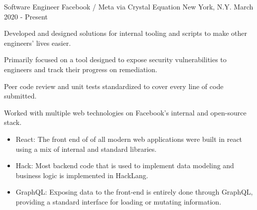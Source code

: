 

\begin{cventries}

  \cventry
    {Software Engineer} %
    {Facebook / Meta via Crystal Equation} %
    {New York, N.Y.} %
    {March 2020 - Present} %
    {
      \begin{cvitems} %
        \item {Developed and designed solutions for internal tooling and scripts to make other engineers' lives easier.}
        \item {Primarily focused on a tool designed to expose security vulnerabilities to engineers and track their progress on remediation.}
        \item {Peer code review and unit tests standardized to cover every line of code submitted.}
        \item {Worked with multiple web technologies on Facebook's internal and open-source stack.}
        \begin{itemize}
          \item {React: The front end of of all modern web applications were built in react using a mix of internal and standard libraries.}
          \item {Hack: Most backend code that is used to implement data modeling and business logic is implemented in HackLang.}
          \item {GraphQL: Exposing data to the front-end is entirely done through GraphQL, providing a standard interface for loading or mutating information.}
        \end{itemize}
      \end{cvitems}
    }


\end{cventries}
